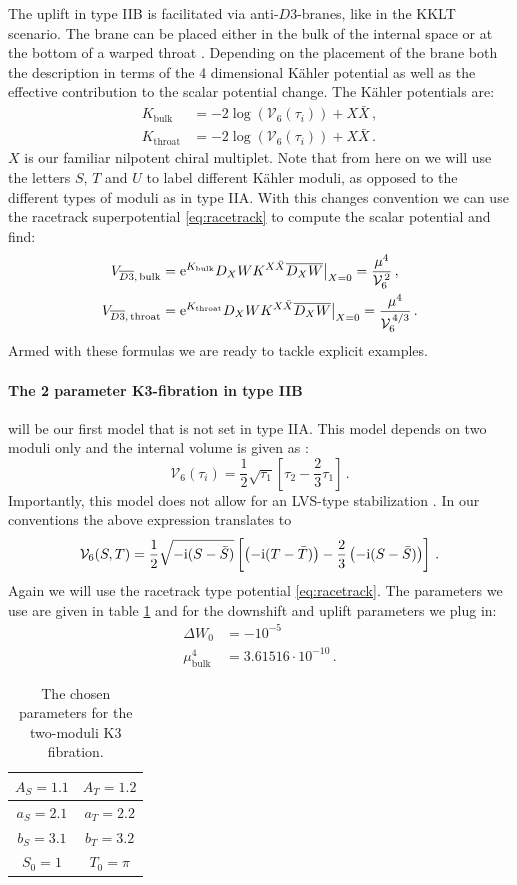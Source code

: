 \documentclass[12pt]{report}
\newcommand{\be}{\begin{equation}}
\newcommand{\ee}{\end{equation}}
\newcommand{\bea}{\begin{equation}\begin{aligned}}
\newcommand{\eea}{\end{aligned}\end{equation}}
\def\rmi{{\rm i}}
\def\rme{{\rm e}}
\begin{document}
The uplift in type IIB is facilitated via anti-$D3$-branes, like in the KKLT scenario. The brane can be placed either in the bulk of the internal space or at the bottom of a warped throat \cite{Kallosh:2017wku}. Depending on the placement of the brane both the description in terms of the 4 dimensional Kähler potential as well as the effective contribution to the scalar potential change. The Kähler potentials are:
\bea
K_{\text{bulk}} &= -2 \log \left( \mathcal{V}_6 (\tau_i)\right) + X\bar{X}\,,\\
K_{\text{throat}} &= -2 \log \left( \mathcal{V}_6 (\tau_i)\right) + X\bar{X}\,.
\eea
$X$ is our familiar nilpotent chiral multiplet. Note that from here on we will use the letters $S$, $T$ and $U$ to label different Kähler moduli, as opposed to the different types of moduli as in type IIA. With this changes convention we can use the racetrack superpotential \eqref{eq:racetrack} to compute the scalar potential and find:
\bea 
V_{\overline{D3},\,\text{bulk}} &= \rme^{K_{\text{bulk}}} D_X W K^{X\bar{X}} \overline{D_X W}\big|_{X=0} = \frac{\mu^4}{\mathcal{V}_6^{\,2}}\,,\\
V_{\overline{D3},\,\text{throat}} &=  \rme^{K_{\text{throat}}} D_X W K^{X\bar{X}} \overline{D_X W}\big|_{X=0} = \frac{\mu^4}{\mathcal{V}_6^{\,4/3}}\,.
\eea
Armed with these formulas we are ready to tackle explicit examples.


\paragraph{The 2 parameter K3-fibration in type IIB} will be our first model that is not set in type IIA. This model depends on two moduli only and the internal volume is given as \cite{Cicoli:2008va}:
\be 
\mathcal{V}_6 (\tau_i) = \frac{1}{2} \sqrt{\tau_1} \left[\tau_2 - \frac{2}{3} \tau_1 \right]\,.
\ee
Importantly, this model does not allow for an LVS-type stabilization \cite{Balasubramanian:2005zx}. In our conventions the above expression translates to
\be 
\mathcal{V}_6(S,T) = \frac{1}{2} \sqrt{-\rmi (S-\bar{S})} \left[ \left( -\rmi (T-\bar{T}) \right) - \frac{2}{3} \left( -\rmi (S-\bar{S})\right) \right]\,.
\ee
Again we will use the racetrack type potential \eqref{eq:racetrack}. The parameters we use are given in table \ref{tab:2modK3para} and for the downshift and uplift parameters we plug in:
\bea 
\Delta W_0 &= -10^{-5}\\
\mu_{\text{bulk}}^4 &= 3.61516 \cdot 10^{-10}\,.
\eea
\begin{table}[htb]
\centering
\begin{tabular}{|c|c|}\hline
$A_S = 1.1$ & $A_T = 1.2$ \\\hline
$a_S = 2.1$ & $a_T = 2.2$ \\\hline
$b_S = 3.1$ & $b_T = 3.2$ \\\hline
$S_0 = 1$ & $T_0 = \pi$ \\\hline
\end{tabular}
\caption{ The chosen parameters for the two-moduli K3 fibration.}
\label{tab:2modK3para}
\end{table}
\end{document}
